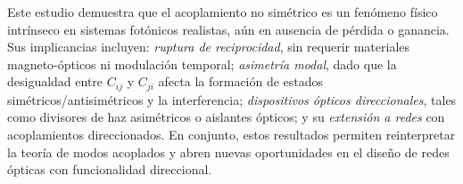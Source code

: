 Este estudio demuestra que el acoplamiento no simétrico es un fenómeno físico intrínseco en sistemas fotónicos realistas, aún en ausencia de pérdida o ganancia. Sus implicancias incluyen: \textit{ruptura de reciprocidad}, sin requerir materiales magneto-ópticos ni modulación temporal; \textit{asimetría modal}, dado que la desigualdad entre \( C_{ij} \) y \( C_{ji} \) afecta la formación de estados simétricos/antisimétricos y la interferencia; \textit{dispositivos ópticos direccionales}, tales como divisores de haz asimétricos o aislantes ópticos; y su \textit{extensión a redes} con acoplamientos direccionados. En conjunto, estos resultados permiten reinterpretar la teoría de modos acoplados y abren nuevas oportunidades en el diseño de redes ópticas con funcionalidad direccional.

